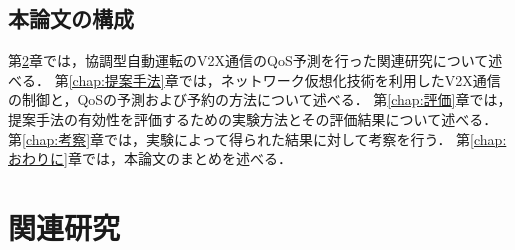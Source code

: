 \documentclass[a4paper,11pt,uplatex]{ujreport}
\begin{document}
\section{本論文の構成}
\label{sec:本論文の構成}

  第\ref{chap:関連研究}章では，協調型自動運転のV2X通信のQoS予測を行った関連研究について述べる．
  第\ref{chap:提案手法}章では，ネットワーク仮想化技術を利用したV2X通信の制御と，QoSの予測および予約の方法について述べる．
  第\ref{chap:評価}章では，提案手法の有効性を評価するための実験方法とその評価結果について述べる．
  第\ref{chap:考察}章では，実験によって得られた結果に対して考察を行う．
  第\ref{chap:おわりに}章では，本論文のまとめを述べる．


\chapter{関連研究}
\label{chap:関連研究}
\end{document}
